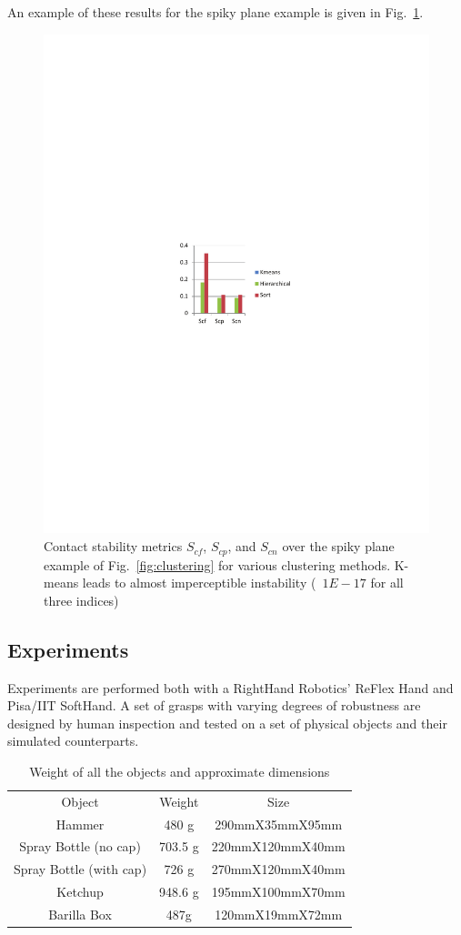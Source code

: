 An example of these results for the spiky plane example is given in Fig.~\ref{fig:SpikyStability}.

\begin{figure}
\centering
\includegraphics[width=0.6\columnwidth]{images/ssoch/spiky_metrics.pdf}
\caption{Contact stability metrics $S_{cf}$, $S_{cp}$, and $S_{cn}$ over the spiky plane example of Fig.~\ref{fig:clustering} for various clustering methods. K-means leads to almost imperceptible instability (~$1E-17$ for all three indices)}
\label{fig:SpikyStability}
\end{figure}


\subsection{Experiments}
\label{experiments5}

Experiments are performed both with a RightHand Robotics' ReFlex Hand and Pisa/IIT SoftHand.  A set of grasps with varying degrees of robustness are designed by human inspection and tested on a set of physical objects and their simulated counterparts.

\begin{table}[hbt]
   \begin{center}
   \begin{tabular}{| c | c | c |}
   \hline
   Object & Weight & Size \\
   \cline{1-3}
   Hammer                   & 480 g     & 290mmX35mmX95mm      \\\hline
   Spray Bottle (no cap)    & 703.5 g   & 220mmX120mmX40mm      \\\hline
   Spray Bottle (with cap)  & 726 g     & 270mmX120mmX40mm      \\\hline
   Ketchup              & 948.6 g   & 195mmX100mmX70mm   \\\hline
   Barilla Box              & 487g      & 120mmX19mmX72mm      \\\hline
   \end{tabular}
   \end{center}
   \caption{Weight of all the objects and approximate dimensions}
   \label{table:object}
\end{table}


